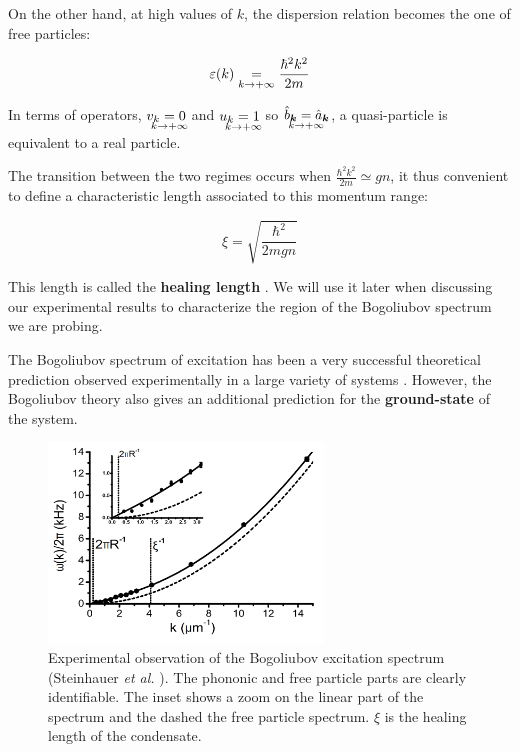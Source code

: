 On the other hand, at high values of $k$, the dispersion relation becomes the one of free particles:

\begin{equation}
    \varepsilon(k) \underrel{k \to +\infty}{=} \frac{\hbar^2 k^2}{2m}
\end{equation}

In terms of operators, $v_k \underrel[c]{k \to +\infty}{=} 0$ and $u_k \underrel[c]{k \to +\infty}{=} 1$ so $\hat{b}_{\bm{k}}\underrel[c]{k \to +\infty}{=}\hat{a}_{\bm{k}}$, a quasi-particle is equivalent to a real particle. 

The transition between the two regimes occurs when $\frac{\hbar^2 k^2}{2m} \simeq gn$, it thus convenient to define a characteristic length associated to this momentum range:

\begin{equation}
    \xi = \sqrt{\frac{\hbar^2}{2mgn}}
\end{equation}

This length is called the \textbf{healing length} . We will use it later when discussing our experimental results to characterize the region of the Bogoliubov spectrum we are probing.

The Bogoliubov spectrum of excitation has been a very successful theoretical prediction observed experimentally in a large variety of systems \cite{miller1962, steinhauer2002excitation, ozeri2005, fontaine2018, stepanov2019}. However, the Bogoliubov theory also gives an additional prediction for the \textbf{ground-state} of the system.

\begin{figure}
    \centering
    \includegraphics[width=0.65\textwidth]{Fig/Chapter1/bogo_steinhauer.png}
    \caption{Experimental observation of the Bogoliubov excitation spectrum (Steinhauer {\it et al.} \cite{steinhauer2002excitation}). The phononic and free particle parts are clearly identifiable. The inset shows a zoom on the linear part of the spectrum and the dashed the free particle spectrum. $\xi$ is the healing length of the condensate.}
    \label{fig:my_label}
\end{figure}

